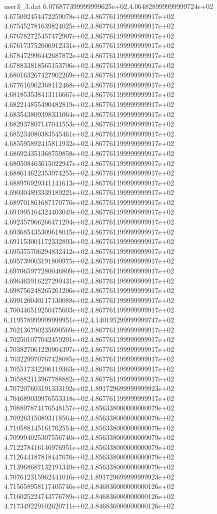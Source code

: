 \begin{filecontents}{user3_3.dat}
6.076877399999999625e+02,4.064828999999999724e+02
4.675092454472259078e+02,4.867761199999999917e+02
4.675452781639824025e+02,4.867761199999999917e+02
4.676782725457472907e+02,4.867761199999999917e+02
4.676173752606912331e+02,4.867761199999999917e+02
4.678472996442687872e+02,4.867761199999999917e+02
4.678833818565153706e+02,4.867761199999999917e+02
4.680163267427902269e+02,4.867761199999999917e+02
4.677616962368112468e+02,4.867761199999999917e+02
4.681853538413116667e+02,4.867761199999999917e+02
4.682214855490482819e+02,4.867761199999999917e+02
4.683543809398331064e+02,4.867761199999999917e+02
4.682937807147041553e+02,4.867761199999999917e+02
4.685234080383545461e+02,4.867761199999999917e+02
4.685595892415811932e+02,4.867761199999999917e+02
4.686924351368759858e+02,4.867761199999999917e+02
4.680508463615022947e+02,4.867761199999999917e+02
4.688614622353974255e+02,4.867761199999999917e+02
4.688976929341141613e+02,4.867761199999999917e+02
4.690304893339189221e+02,4.867761199999999917e+02
4.689701861687170776e+02,4.867761199999999917e+02
4.691995164324403049e+02,4.867761199999999917e+02
4.692357966266471294e+02,4.867761199999999917e+02
4.693685435309618015e+02,4.867761199999999917e+02
4.691153001172332893e+02,4.867761199999999917e+02
4.695375706294832412e+02,4.867761199999999917e+02
4.695739003191800975e+02,4.867761199999999917e+02
4.697065977280046809e+02,4.867761199999999917e+02
4.696465916227299431e+02,4.867761199999999917e+02
4.698756248265261206e+02,4.867761199999999917e+02
4.699120040117130088e+02,4.867761199999999917e+02
4.700446519250475603e+02,4.867761199999999917e+02
6.119578999999999951e+02,4.140195299999999747e+02
4.702136790235690569e+02,4.867761199999999917e+02
4.702501077042459201e+02,4.867761199999999917e+02
4.703827061220904397e+02,4.867761199999999917e+02
4.703229970767428085e+02,4.867761199999999917e+02
4.705517332206119363e+02,4.867761199999999917e+02
4.705882113967788882e+02,4.867761199999999917e+02
4.707207603191333192e+02,1.891729699999999923e+02
4.704689039976553318e+02,4.867761199999999917e+02
4.708897874176548157e+02,4.856338000000000079e+02
4.709263150893118564e+02,4.856338000000000079e+02
4.710588145161762554e+02,4.856338000000000079e+02
4.709994025307556740e+02,4.856338000000000079e+02
4.712278416146976951e+02,4.856338000000000079e+02
4.712644187818447676e+02,4.856338000000000079e+02
4.713968687132191349e+02,4.856338000000000079e+02
4.707612315962441016e+02,1.891729699999999923e+02
4.715658958117405746e+02,4.846836000000000126e+02
4.716025224743776789e+02,4.846836000000000126e+02
4.717349229102620711e+02,4.846836000000000126e+02

\end{filecontents}
